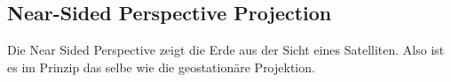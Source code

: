 \subsection{Near-Sided Perspective Projection}
\label{sec:nearsideperspective}
Die Near Sided Perspective zeigt die Erde aus der Sicht eines Satelliten. Also ist es im Prinzip das selbe
wie die geostationäre Projektion.